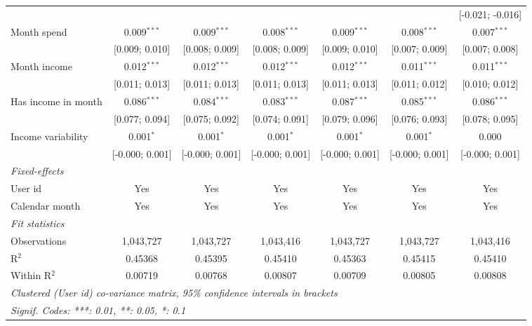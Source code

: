 \begin{table}[htbp]
\begin{threeparttable}[b]
\begin{tabular}{lcccccc}
                                    &                 &                 &                 &                  &                  & [-0.021; -0.016]\\   
         Month spend                & 0.009$^{***}$   & 0.009$^{***}$   & 0.008$^{***}$   & 0.009$^{***}$    & 0.008$^{***}$    & 0.007$^{***}$\\   
                                    & [0.009; 0.010]  & [0.008; 0.009]  & [0.008; 0.009]  & [0.009; 0.010]   & [0.007; 0.009]   & [0.007; 0.008]\\   
         Month income               & 0.012$^{***}$   & 0.012$^{***}$   & 0.012$^{***}$   & 0.012$^{***}$    & 0.011$^{***}$    & 0.011$^{***}$\\   
                                    & [0.011; 0.013]  & [0.011; 0.013]  & [0.011; 0.013]  & [0.011; 0.013]   & [0.011; 0.012]   & [0.010; 0.012]\\   
         Has income in month        & 0.086$^{***}$   & 0.084$^{***}$   & 0.083$^{***}$   & 0.087$^{***}$    & 0.085$^{***}$    & 0.086$^{***}$\\   
                                    & [0.077; 0.094]  & [0.075; 0.092]  & [0.074; 0.091]  & [0.079; 0.096]   & [0.076; 0.093]   & [0.078; 0.095]\\   
         Income variability         & 0.001$^{*}$     & 0.001$^{*}$     & 0.001$^{*}$     & 0.001$^{*}$      & 0.001$^{*}$      & 0.000\\   
                                    & [-0.000; 0.001] & [-0.000; 0.001] & [-0.000; 0.001] & [-0.000; 0.001]  & [-0.000; 0.001]  & [-0.000; 0.001]\\   
         \midrule
         \emph{Fixed-effects}\\
         User id                    & Yes             & Yes             & Yes             & Yes              & Yes              & Yes\\  
         Calendar month             & Yes             & Yes             & Yes             & Yes              & Yes              & Yes\\  
         \midrule
         \emph{Fit statistics}\\
         Observations               & 1,043,727       & 1,043,727       & 1,043,416       & 1,043,727        & 1,043,727        & 1,043,416\\  
         R$^2$                      & 0.45368         & 0.45395         & 0.45410         & 0.45363          & 0.45415          & 0.45410\\  
         Within R$^2$               & 0.00719         & 0.00768         & 0.00807         & 0.00709          & 0.00805          & 0.00808\\  
         \midrule \midrule
         \multicolumn{7}{l}{\emph{Clustered (User id) co-variance matrix, 95\% confidence intervals in brackets}}\\
         \multicolumn{7}{l}{\emph{Signif. Codes: ***: 0.01, **: 0.05, *: 0.1}}\\
      \end{tabular}
   \end{threeparttable}
\end{table}


